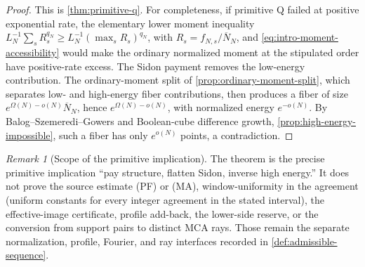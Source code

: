 \documentclass[12pt,a4paper]{amsart}
\numberwithin{equation}{section}
\theoremstyle{remark}
\newtheorem{remark}[remark]{Remark}
\newcommand{\barN}{\overline N}
\begin{document}
\begin{proof}
This is \cref{thm:primitive-q}.  For completeness, if primitive Q failed
at positive exponential rate, the elementary lower moment inequality
\(L_N^{-1}\sum_sR_s^{q_N}\ge L_N^{-1}(\max_sR_s)^{q_N}\), with
\(R_s=f_{N,s}/\barN_N\), and
\eqref{eq:intro-moment-accessibility} would make the ordinary normalized
moment at the stipulated order have positive-rate excess.
The Sidon payment removes the low-energy contribution.  The
ordinary-moment split of \cref{prop:ordinary-moment-split}, which
separates low- and high-energy fiber contributions, then produces a fiber
of size \(e^{\Omega(N)-o(N)}\barN_N\), hence
\(e^{\Omega(N)-o(N)}\), with normalized energy \(e^{-o(N)}\).  By
Balog--Szemeredi--Gowers and Boolean-cube difference growth,
\cref{prop:high-energy-impossible}, such a fiber has only
\(e^{o(N)}\) points, a contradiction.
\end{proof}

\begin{remark}[Scope of the primitive implication]
\label{rem:intro-sidon-heavy-scope}
The theorem is the precise primitive implication ``pay structure, flatten
Sidon, inverse high energy.''  It does not prove the source estimate
\textup{(PF)} or \textup{(MA)}, window-uniformity in the agreement
(uniform constants for every integer agreement in the stated interval), the
effective-image certificate, profile add-back, the lower-side reserve, or
the conversion from support pairs to distinct MCA rays.  Those remain the
separate normalization, profile, Fourier, and ray interfaces recorded in
\cref{def:admissible-sequence}.
\end{remark}
\end{document}
